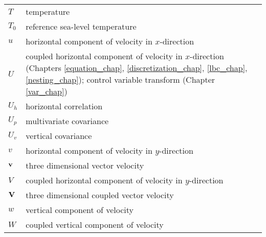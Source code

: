 \begin{tabular}{ l p{5.5in} }
$T$            & temperature \\
$T_0$          & reference sea-level temperature \\
$u$            & horizontal component of velocity in $x$-direction \\
$U$            & coupled horizontal component of velocity in $x$-direction (Chapters \ref{equation_chap}, \ref{discretization_chap}, \ref{lbc_chap}, \ref{nesting_chap}); control variable transform (Chapter \ref{var_chap}) \\
$U_h$          & horizontal correlation \\
$U_p$          & multivariate covariance \\
$U_v$          & vertical covariance \\
$v$            & horizontal component of velocity in $y$-direction \\
$\bf v$        & three dimensional vector velocity \\
$V$            & coupled horizontal component of velocity in $y$-direction \\
$\bf V$        & three dimensional coupled vector velocity \\
$w$            & vertical component of velocity \\
$W$            & coupled vertical component of velocity \\

\end{tabular}

